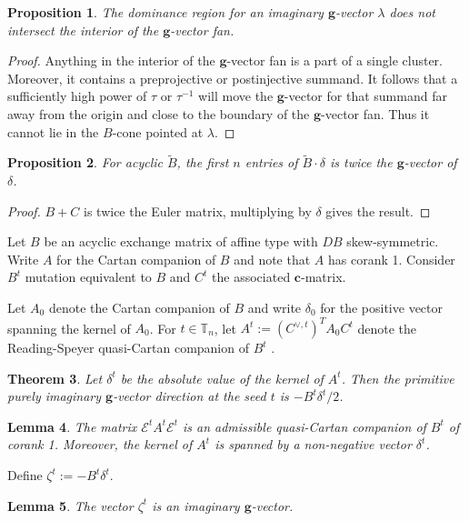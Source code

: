 \documentclass{amsart}
\newtheorem{theorem}{Theorem}
\newtheorem{lemma}[theorem]{Lemma}
\newtheorem{proposition}[theorem]{Proposition}
\numberwithin{theorem}{section}
\newcommand{\bfc}{\boldsymbol{c}}
\newcommand{\bfg}{\boldsymbol{g}}
\newcommand{\cE}{\mathcal{E}}
\newcommand{\TT}{\mathbb{T}}
\begin{document}
  \begin{proposition}
    The dominance region for an imaginary $\bfg$-vector $\lambda$ does not intersect the interior of the $\bfg$-vector fan.
  \end{proposition}
  \begin{proof}
    Anything in the interior of the $\bfg$-vector fan is a part of a single cluster.
    Moreover, it contains a preprojective or postinjective summand.
    It follows that a sufficiently high power of $\tau$ or $\tau^{-1}$ will move the $\bfg$-vector for that summand far away from the origin and close to the boundary of the $\bfg$-vector fan.
    Thus it cannot lie in the $B$-cone pointed at $\lambda$.
  \end{proof}

  \begin{proposition}
    For acyclic $\tilde B$, the first $n$ entries of $\tilde B\cdot\delta$ is twice the $\bfg$-vector of $\delta$.
  \end{proposition}
  \begin{proof}
    $B+C$ is twice the Euler matrix, multiplying by $\delta$ gives the result.
  \end{proof}


  Let $B$ be an acyclic exchange matrix of affine type with $DB$ skew-symmetric.
  Write $A$ for the Cartan companion of $B$ and note that $A$ has corank 1.
  Consider $B^t$ mutation equivalent to $B$ and $C^t$ the associated $\bfc$-matrix.

  Let $A_0$ denote the Cartan companion of $B$ and write $\delta_0$ for the positive vector spanning the kernel of $A_0$.
  For $t\in\TT_n$, let $A^t:=(C^{\vee,t})^T A_0 C^t$ denote the Reading-Speyer quasi-Cartan companion of $B^t$ \cite[Cor. 3.29]{Combinatorial Frameworks for Cluster Algebras}.
  \begin{theorem}
    Let $\delta^t$ be the absolute value of the kernel of $A^t$.
    Then the primitive purely imaginary $\bfg$-vector direction at the seed $t$ is $-B^t\delta^t/2$.
  \end{theorem}

  \begin{lemma}
    The matrix $\cE^t A^t \cE^t$ is an admissible quasi-Cartan companion of $B^t$ of corank 1.
    Moreover, the kernel of $A^t$ is spanned by a non-negative vector $\delta^t$. 
  \end{lemma}

  Define $\zeta^t := -B^t \delta^t$.
  \begin{lemma}
    The vector $\zeta^t$ is an imaginary $\bfg$-vector.
  \end{lemma}
\end{document}
